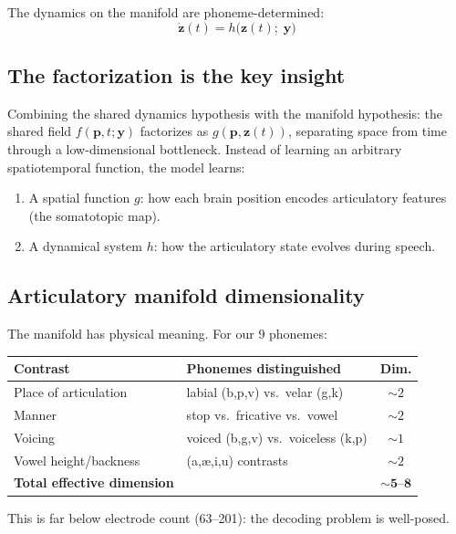 \documentclass[11pt,letterpaper]{article}
\newcommand{\bfp}{\mathbf{p}}
\newcommand{\bfz}{\mathbf{z}}
\newcommand{\bfy}{\mathbf{y}}
\begin{document}
The dynamics on the manifold are phoneme-determined:
\begin{equation}\label{eq:dynamics}
\dot{\bfz}(t) = h\bigl(\bfz(t);\; \bfy\bigr)
\end{equation}

\subsection{The factorization is the key insight}

Combining the shared dynamics hypothesis with the manifold hypothesis: the shared field $f(\bfp, t; \bfy)$ factorizes as $g(\bfp, \bfz(t))$, separating space from time through a low-dimensional bottleneck. Instead of learning an arbitrary spatiotemporal function, the model learns:
\begin{enumerate}[leftmargin=2em]
\item A spatial function $g$: how each brain position encodes articulatory features (the somatotopic map).
\item A dynamical system $h$: how the articulatory state evolves during speech.
\end{enumerate}

\subsection{Articulatory manifold dimensionality}

The manifold has physical meaning. For our 9 phonemes:

\begin{table}[ht]\centering\small
\begin{tabular}{@{}llc@{}}
\toprule
\textbf{Contrast} & \textbf{Phonemes distinguished} & \textbf{Dim.}\\
\midrule
Place of articulation & labial (b,p,v) vs.\ velar (g,k) & ${\sim}2$ \\
Manner & stop vs.\ fricative vs.\ vowel & ${\sim}2$ \\
Voicing & voiced (b,g,v) vs.\ voiceless (k,p) & ${\sim}1$ \\
Vowel height/backness & (a,\ae,i,u) contrasts & ${\sim}2$ \\
\midrule
\textbf{Total effective dimension} & & ${\sim}\mathbf{5\text{--}8}$ \\
\bottomrule
\end{tabular}
\end{table}

This is far below electrode count (63--201): the decoding problem is well-posed.
\end{document}
